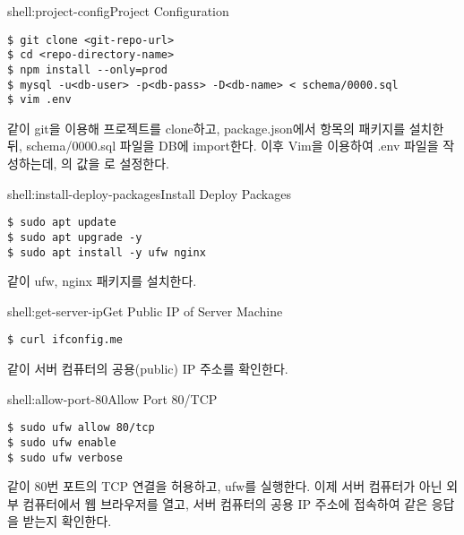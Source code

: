 \begin{shell}{shell:project-config}{Project Configuration}
\begin{verbatim}
$ git clone <git-repo-url>
$ cd <repo-directory-name>
$ npm install --only=prod
$ mysql -u<db-user> -p<db-pass> -D<db-name> < schema/0000.sql
$ vim .env
\end{verbatim}
\end{shell}

\와 같이 git을 이용해 프로젝트를 clone하고, package.json에서  항목의 패키지를 설치한 뒤, schema/0000.sql 파일을 DB에 import한다. 이후 Vim을 이용하여 .env 파일을 작성하는데, 의 값을 로 설정한다.

\begin{shell}{shell:install-deploy-packages}{Install Deploy Packages}
\begin{verbatim}
$ sudo apt update
$ sudo apt upgrade -y
$ sudo apt install -y ufw nginx
\end{verbatim}
\end{shell}

\와 같이 ufw, nginx 패키지를 설치한다.

\begin{shell}{shell:get-server-ip}{Get Public IP of Server Machine}
\begin{verbatim}
$ curl ifconfig.me
\end{verbatim}
\end{shell}

\와 같이 서버 컴퓨터의 공용(public) IP 주소를 확인한다.

\begin{shell}{shell:allow-port-80}{Allow Port 80/TCP}
\begin{verbatim}
$ sudo ufw allow 80/tcp
$ sudo ufw enable
$ sudo ufw verbose
\end{verbatim}
\end{shell}

\과 같이 80번 포트의 TCP 연결을 허용하고, ufw를 실행한다. 이제 서버 컴퓨터가 아닌 외부 컴퓨터에서 웹 브라우저를 열고, 서버 컴퓨터의 공용 IP 주소에 접속하여 \와 같은 응답을 받는지 확인한다.


